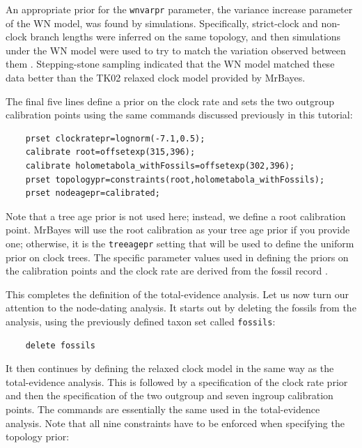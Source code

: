 \documentclass[12pt]{book}
\newcommand{\ttt}[1]{\texttt{#1}}
\begin{document}
An appropriate prior for the \ttt{wnvarpr} parameter, the variance increase parameter of the WN
model, was found by simulations. Specifically, strict-clock and non-clock branch lengths were
inferred on the same topology, and then simulations under the WN model were used to try to match
the variation observed between them \citep{ronquist12b}. Stepping-stone sampling indicated that the
WN model matched these data better than the TK02 relaxed clock model provided by MrBayes.

The final five lines define a prior on the clock rate and sets the two outgroup calibration points
using the same commands discussed previously in this tutorial:

\small
\begin{singlespacing}
\begin{verbatim}
    prset clockratepr=lognorm(-7.1,0.5);
    calibrate root=offsetexp(315,396);
    calibrate holometabola_withFossils=offsetexp(302,396);
    prset topologypr=constraints(root,holometabola_withFossils);
    prset nodeagepr=calibrated;
\end{verbatim}
\end{singlespacing}
\normalsize

Note that a tree age prior is not used here; instead, we define a root calibration point. MrBayes
will use the root calibration as your tree age prior if you provide one; otherwise, it is the
\ttt{treeagepr} setting that will be used to define the uniform prior on clock trees. The specific
parameter values used in defining the priors on the calibration points and the clock rate are
derived from the fossil record \citep{ronquist12b}.

This completes the definition of the total-evidence analysis. Let us now turn our attention to the
node-dating analysis. It starts out by deleting the fossils from the analysis, using the previously
defined taxon set called \ttt{fossils}:

\small
\begin{verbatim}
    delete fossils
\end{verbatim}
\normalsize

It then continues by defining the relaxed clock model in the same way as the total-evidence
analysis. This is followed by a specification of the clock rate prior and then the specification of
the two outgroup and seven ingroup calibration points. The commands are essentially the same used
in the total-evidence analysis. Note that all nine constraints have to be enforced when specifying
the topology prior:
\end{document}
